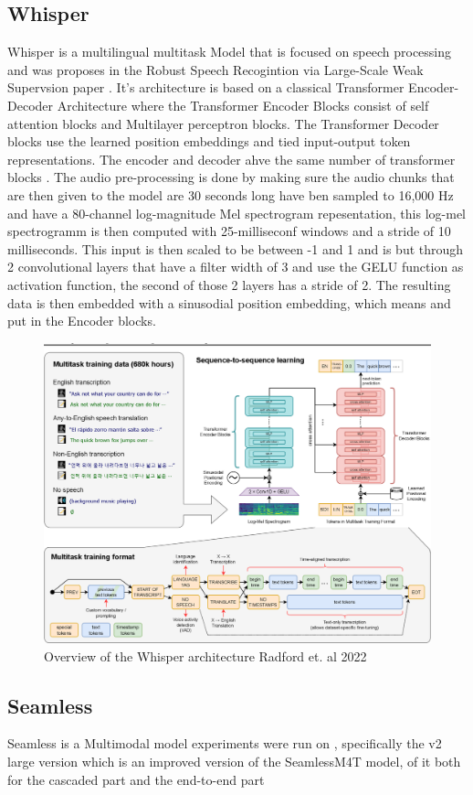 \subsection{Whisper}
Whisper is a multilingual multitask Model that is focused on speech processing and was proposes in the Robust Speech Recogintion via Large-Scale Weak Supervsion paper \cite{radford2022robust}. 
It's architecture is based on a classical Transformer Encoder-Decoder Architecture where the Transformer Encoder Blocks consist of self attention blocks and Multilayer perceptron blocks. 
The Transformer Decoder blocks use the learned position embeddings and tied input-output token representations. 
The encoder and decoder ahve the same number of transformer blocks .
The audio pre-processing is done by making sure the audio chunks that are then given to the model are 30 seconds long have ben sampled to 16,000 Hz and have a 80-channel log-magnitude Mel spectrogram repesentation, this log-mel spectrogramm is then computed with 25-milliseconf windows and a stride of 10 milliseconds. 
This input is then scaled to be between -1 and 1 and is but through 2 convolutional layers that have a filter width of 3 and use the GELU function as activation function, the second of those 2 layers has a stride of 2. 
The resulting data is then embedded with a sinusodial position embedding, which means %
and put in the Encoder blocks. 

\begin{figure}
        \centering
        \includegraphics[width=0.5\linewidth]{Latex//sections//images/whispermodel.png}
        \caption{Overview of the Whisper architecture Radford et. al 2022}
        \label{fig:whispermodel}
    \end{figure}

\subsection{Seamless}

Seamless is a Multimodal model 
experiments were run on \cite{seamless2023}, specifically the v2 large version which is an improved version of the SeamlessM4T model, 
of it both for the cascaded part and the end-to-end part

